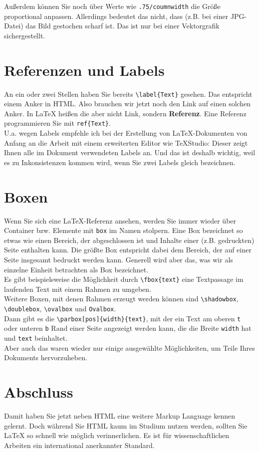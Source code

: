 Außerdem können Sie noch über Werte wie \verb|.75/coumnwidth| die Größe proportional anpassen. Allerdings bedeutet das nicht, dass (z.B. bei einer JPG-Datei) das Bild gestochen scharf ist. Das ist nur bei einer Vektorgrafik sichergestellt.

\section{Referenzen und Labels}

An ein oder zwei Stellen haben Sie bereits \verb|\label{Text}| gesehen. Das entspricht einem Anker in HTML. Also brauchen wir jetzt noch den \glqq{}Link\grqq{} auf einen solchen Anker. In LaTeX heißen die aber nicht Link, sondern \textbf{Referenz}. Eine Referenz programmieren Sie mit \verb|ref{Text}|.\\

U.a. wegen Labels empfehle ich bei der Erstellung von LaTeX-Dokumenten von Anfang an die Arbeit mit einem erweiterten Editor wie TeXStudio: Dieser zeigt Ihnen alle im Dokument verwendeten Labels an. Und das ist deshalb wichtig, weil es zu Inkonsistenzen kommen wird, wenn Sie zwei Labels gleich bezeichnen.

\section{Boxen}

Wenn Sie sich eine LaTeX-Referenz ansehen, werden Sie immer wieder über Container bzw. Elemente mit \verb|box| im Namen stolpern. Eine Box bezeichnet so etwas wie einen Bereich, der abgeschlossen ist und Inhalte einer (z.B. gedruckten) Seite enthalten kann. Die größte Box entspricht dabei dem Bereich, der auf einer Seite insgesamt bedruckt werden kann. Generell wird aber das, was wir als einzelne Einheit betrachten als Box bezeichnet.\\

Es gibt beispielsweise die Möglichkeit durch \verb|\fbox{text}| eine Textpassage im laufenden Text mit einem Rahmen zu umgeben.\\

Weitere Boxen, mit denen Rahmen erzeugt werden können sind \verb|\shadowbox|, \verb|\doublebox|, \verb|\ovalbox| und \verb|Ovalbox|.\\

Dann gibt es die \verb|\parbox[pos]{width}{text}|, mit der ein Text am oberen \verb|t| oder unteren \verb|b| Rand einer Seite angezeigt werden kann, die die Breite \verb|width| hat und \verb|text| beinhaltet.\\

Aber auch das waren wieder nur einige ausgewählte Möglichkeiten, um Teile Ihres Dokuments hervorzuheben.

\section{Abschluss}

Damit haben Sie jetzt neben HTML eine weitere Markup Language kennen gelernt. Doch während Sie HTML kaum im Studium nutzen werden, sollten Sie LaTeX so schnell wie möglich verinnerlichen. Es ist für wissenschaftlichen Arbeiten ein international anerkannter Standard.